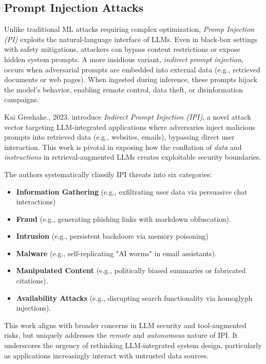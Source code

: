 \documentclass[../main.tex]{subfiles}
\begin{document}
\subsection{Prompt Injection Attacks}
Unlike traditional ML attacks requiring complex optimization, \emph{Promp Injection (PI)} exploits the natural-language interface of LLMs. Even in black-box settings with safety mitigations, attackers can bypass content restrictions or expose hidden system prompts. A more insidious variant, \emph{indirect prompt injection}, occurs when adversarial prompts are embedded into external data (e.g., retrieved documents or web pages). When ingested during inference, these prompts hijack the model’s behavior, enabling remote control, data theft, or disinformation campaigns. \cite{greshake2023youvesignedforcompromising} 

Kai Greshake., 2023. \cite{greshake2023youvesignedforcompromising} introduce \emph{Indirect Prompt Injection (IPI)}, a novel attack vector targeting LLM-integrated applications where adversaries inject malicious prompts into retrieved data (e.g., websites, emails), bypassing direct user interaction. This work is pivotal in exposing how the conflation of \emph{data} and \emph{instructions} in retrieval-augmented LLMs creates exploitable security boundaries.

The authors systematically classify IPI threats into six categories:
\begin{itemize}
    \item \textbf{Information Gathering} (e.g., exfiltrating user data via persuasive chat interactions)
    \item \textbf{Fraud} (e.g., generating phishing links with markdown obfuscation).
    \item \textbf{Intrusion} (e.g., persistent backdoors via memory poisoning)
    \item \textbf{Malware} (e.g., self-replicating "AI worms" in email assistants).
    \item \textbf{Manipulated Content} (e.g., politically biased summaries or fabricated citations).
    \item \textbf{Availability Attacks} (e.g., disrupting search functionality via homoglyph injections).
\end{itemize}

This work aligns with broader concerns in LLM security and tool-augmented risks, but uniquely addresses the \emph{remote} and \emph{autonomous} nature of IPI. It underscores the urgency of rethinking LLM-integrated system design, particularly as applications increasingly interact with untrusted data sources.
\end{document}

